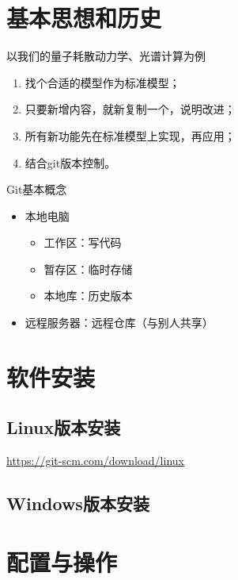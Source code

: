 \section{基本思想和历史}
以我们的量子耗散动力学、光谱计算为例
\begin{enumerate}
\item 找个合适的模型作为标准模型；
\item 只要新增内容，就新复制一个，说明改进；
\item 所有新功能先在标准模型上实现，再应用；
\item 结合git版本控制。
\end{enumerate}


Git基本概念
\begin{itemize}
\item 本地电脑
\begin{itemize}
\item 工作区：写代码
\item 暂存区：临时存储
\item 本地库：历史版本
\end{itemize}

\item 远程服务器：远程仓库（与别人共享）
\end{itemize}






\section{软件安装}
\subsection{Linux版本安装}
\url{https://git-scm.com/download/linux}


\subsection{Windows版本安装}


\section{配置与操作}
